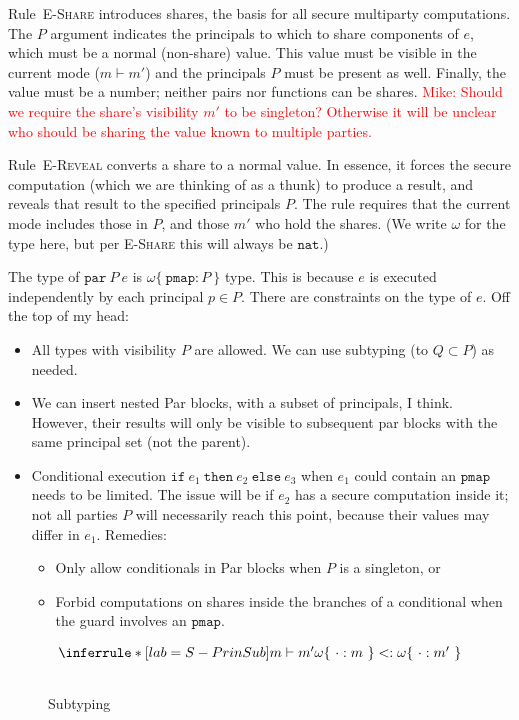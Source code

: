 \documentclass[10pt]{article}
\newcommand{\rulelab}[1]{{\small \textsc{#1}}}
\newcommand{\kw}[1]{\ensuremath{\mathtt{#1}}}
\newcommand{\tnat}{\ensuremath{\mathtt{nat}}}
\newcommand{\ssec}{\ensuremath{\mathtt{\cdot}}}
\newcommand{\isec}{\ensuremath{\mathtt{pmap}}}
\newcommand{\sectyp}[3]{\ensuremath{{#1} \{~{#2}:{#3}~\}}}
\newcommand{\epar}[2]{\ensuremath{\kw{par}~{#1}~{#2}}}
\newcommand{\econd}[3]{\ensuremath{\kw{if}~{#1}~\kw{then}~{#2}~\kw{else}~{#3}}}
\newcommand{\subtype}{\ensuremath{<:}}
\newcommand{\issub}[2]{{#1} \subtype {#2}}
\newcommand{\mwh}[1]{\textcolor{red}{Mike: #1}}
\begin{document}
Rule~\rulelab{E-Share} introduces shares, the basis for all secure
multiparty computations. The $P$ argument indicates the principals to
which to share components of $e$, which must be a normal (non-share)
value. This value must be visible in the current mode ($m \vdash m'$)
and the principals $P$ must be present as well. Finally, the value
must be a number; neither pairs nor functions can be shares.
\mwh{Should we require the share's visibility $m'$ to be singleton?
  Otherwise it will be unclear who should be sharing the value known
  to multiple parties.}

Rule~\rulelab{E-Reveal} converts a share to a normal value. In
essence, it forces the secure computation (which we are thinking of as
a thunk) to produce a result, and reveals that result to the specified
principals $P$. The rule requires that the current mode includes those
in $P$, and those $m'$ who hold the shares. (We write $\omega$ for the
type here, but per \rulelab{E-Share} this will always be $\tnat$.)

The type of $\epar{P}{e} $ is $\sectyp{\omega}{\isec}{P}$
type. This is because $e$ is executed independently by each principal
$p \in P$. There are constraints on the type of $e$. Off the top of my
head:
\begin{itemize}
\item All types with visibility $P$ are allowed. We can use subtyping
  (to $Q \subset P$) as needed.
  \item We can insert nested Par blocks, with a subset of principals,
    I think. However, their results will only be visible to subsequent
    par blocks with the same principal set (not the parent).
  \item Conditional execution $\econd{e_1}{e_2}{e_3}$ when $e_1$ could
    contain an $\isec$ needs to be limited. The issue will be if $e_2$
    has a secure computation inside it; not all parties $P$ will
    necessarily reach this point, because their values may differ in
    $e_1$. Remedies:
    \begin{itemize}
      \item Only allow conditionals in Par blocks when $P$ is a singleton, or
      \item Forbid computations on shares inside the branches of a
        conditional when the guard involves an \isec.
      \end{itemize}
\end{itemize}

\begin{figure}
\[\begin{array}{c}

    \inferrule*[lab=S-PrinSub]
    {
    m \vdash m'
    }
    {
    \issub{\sectyp{\omega}{\ssec}{m}}{\sectyp{\omega}{\ssec}{m'}}
    }
    \\ \\
    
\end{array}
\]
\caption{Subtyping}
\label{fig:sub}
\end{figure}
\end{document}
